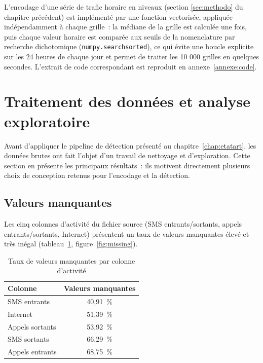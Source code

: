 L'encodage d'une série de trafic horaire en niveaux (section
\ref{sec:methodo} du chapitre précédent) est implémenté par une
fonction vectorisée, appliquée indépendamment à chaque grille~: la
médiane de la grille est calculée une fois, puis chaque valeur
horaire est comparée aux seuils de la nomenclature par recherche
dichotomique (\texttt{numpy.searchsorted}), ce qui évite une boucle
explicite sur les 24 heures de chaque jour et permet de traiter les
10 000 grilles en quelques secondes. L'extrait de code correspondant
est reproduit en annexe~\ref{annexe:code}.

\section{Traitement des données et analyse exploratoire}

Avant d'appliquer le pipeline de détection présenté au
chapitre~\ref{chap:etatart}, les données brutes ont fait l'objet d'un
travail de nettoyage et d'exploration. Cette section en présente les
principaux résultats~: ils motivent directement plusieurs choix de
conception retenus pour l'encodage et la détection.

\subsection{Valeurs manquantes}

Les cinq colonnes d'activité du fichier source (SMS entrants/sortants,
appels entrants/sortants, Internet) présentent un taux de valeurs
manquantes élevé et très inégal (tableau~\ref{tab:missing},
figure~\ref{fig:missing}).

\begin{table}[htbp]
  \centering
  \caption{Taux de valeurs manquantes par colonne d'activité}
  \label{tab:missing}
  \begin{tabular}{lc}
    \toprule
    \textbf{Colonne} & \textbf{Valeurs manquantes} \\
    \midrule
    SMS entrants  & 40,91~\% \\
    Internet      & 51,39~\% \\
    Appels sortants & 53,92~\% \\
    SMS sortants  & 66,29~\% \\
    Appels entrants & 68,75~\% \\
    \bottomrule
  \end{tabular}
\end{table}


